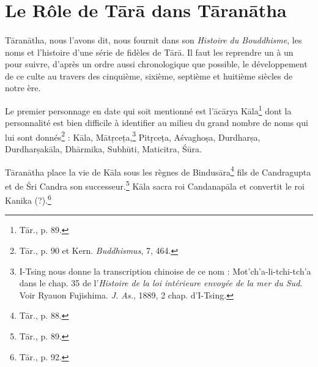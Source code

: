 \documentclass[a4paper, 11pt, oneside, french]{article}
\begin{document}
\section{Le Rôle de T\={a}r\={a} dans T\={a}ran\={a}tha}
\paragraph{}
T\={a}ran\={a}tha, nous l'avons dit, nous fournit dans son \emph{Histoire du Bouddhisme}, les noms et l'histoire d'une série de fidèles de T\={a}r\={a}. Il faut les reprendre un à un pour suivre, d'après un ordre aussi chronologique que possible, le développement de ce culte au travers des cinquième, sixième, septième et huitième siècles de notre ère.

Le premier personnage en date qui soit mentionné est l'\={a}c\={a}rya K\={a}la\footnote{T\={a}r., p. 89.} dont la personnalité est bien difficile à identifier au milieu du grand nombre de noms qui lui sont donnés\footnote{T\={a}r., p. 90 et Kern. \emph{Buddhismus}, 7, 464.} : K\={a}la, M\={a}t\d{r}ce\d{t}a,\footnote{I-Tsing nous donne la transcription chinoise de ce nom : Mot'ch'a-li-tchi-tch'a dans le chap. 35 de l'\emph{Histoire de la loi intérieure envoyée de la mer du Sud}. Voir Ryauon Fujishima. \emph{J. As.}, 1889, 2 chap. d'I-Tsing.} Pit\d{r}ce\d{t}a, A\'{s}vagho\d{s}a, Durdhar\d{s}a, Durdhar\d{s}ak\={a}la, Dh\={a}rmika, Subh\={u}ti, Maticitra, \'{S}\={u}ra.

T\={a}ran\={a}tha place la vie de K\={a}la sous les règnes de Bindus\={a}ra\footnote{T\={a}r., p. 88.} fils de Candragupta et de \'{S}ri Candra son successeur.\footnote{T\={a}r., p. 89.} K\={a}la sacra roi Candanap\={a}la et convertit le roi Kanika (?).\footnote{T\={a}r., p. 92.}
\end{document}
